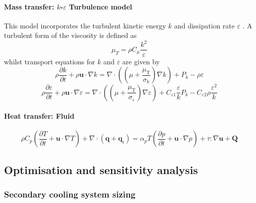 \paragraph{Mass transfer: $k$-$\varepsilon$ Turbulence model}
This model incorporates the turbulent kinetic energy $k$ and dissipation rate $\varepsilon$ \cite{comsol_cfd_2020}. A turbulent form of the viscosity is defined as
\begin{equation}
    \mu_{T}=\rho C_{\mu} \frac{k^{2}}{\varepsilon}
\end{equation}
whilst transport equations for $k$ and $\varepsilon$ are given by
\begin{equation}
\rho \frac{\partial k}{\partial t}+\rho \mathbf{u} \cdot \nabla k=\nabla \cdot\left(\left(\mu+\frac{\mu_{\mathrm{T}}}{\sigma_{k}}\right) \nabla k\right)+P_{k}-\rho \varepsilon
\end{equation}
\begin{equation}
\rho \frac{\partial \varepsilon}{\partial t}+\rho \mathbf{u} \cdot \nabla \varepsilon=\nabla \cdot\left(\left(\mu+\frac{\mu_{\mathrm{T}}}{\sigma_{\varepsilon}}\right) \nabla \varepsilon\right)+C_{\varepsilon 1} \frac{\varepsilon}{k} P_{k}-C_{\varepsilon 2} \rho \frac{\varepsilon^{2}}{k}
\end{equation}

\paragraph{Heat transfer: Fluid}
\cite{comsol_heat_2020}
\begin{equation}
    \rho C_{p}\left(\frac{\partial T}{\partial t}+\mathbf{u} \cdot \nabla T\right)+\nabla \cdot\left(\mathbf{q}+\mathbf{q}_{\mathrm{r}}\right)=\alpha_{p} T\left(\frac{\partial p}{\partial t}+\mathbf{u} \cdot \nabla p\right)+\tau: \nabla \mathbf{u}+\mathbf{Q}
\end{equation}

\subsection{Optimisation and sensitivity analysis}

\subsubsection{Secondary cooling system sizing}

